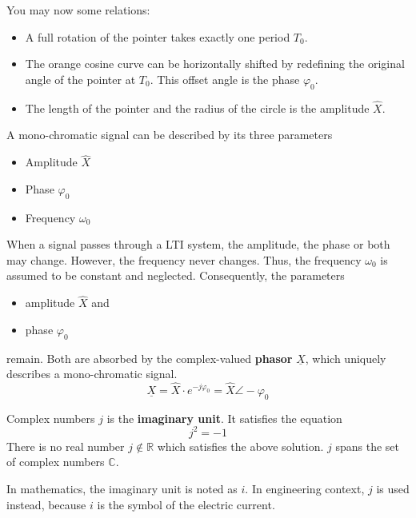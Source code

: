 \begin{refsection}
You may now some relations:
\begin{itemize}
	\item A full rotation of the pointer takes exactly one period $T_0$.
	\item The orange cosine curve can be horizontally shifted by redefining the original angle of the pointer at $T_0$. This offset angle is the phase $\varphi_0$.
	\item The length of the pointer and the radius of the circle is the amplitude $\hat{X}$.
\end{itemize}

A mono-chromatic signal can be described by its three parameters
\begin{itemize}
	\item Amplitude $\hat{X}$
	\item Phase $\varphi_0$
	\item Frequency $\omega_0$
\end{itemize}

When a signal passes through a \ac{LTI} system, the amplitude, the phase or both may change. However, the frequency never changes. Thus, the frequency $\omega_0$ is assumed to be constant and neglected. Consequently, the parameters
\begin{itemize}
	\item amplitude $\hat{X}$ and
	\item phase $\varphi_0$
\end{itemize}
remain. Both are absorbed by the complex-valued  \textbf{phasor} $\underline{X}$, which uniquely describes a mono-chromatic signal.
\begin{equation}
	\underline{X} = \hat{X} \cdot e^{-j \varphi_0} = \hat{X} \angle -\varphi_0
\end{equation}%

\begin{excursus}{Complex numbers}
	$j$ is the  \textbf{imaginary unit}. It satisfies the equation
	\begin{equation}
		j^2 = -1
	\end{equation}%
	There is no real number $j \notin \mathbb{R}$ which satisfies the above solution. $j$ spans the set of complex numbers $\mathbb{C}$.
	
	In mathematics, the imaginary unit is noted as $i$. In engineering context, $j$ is used instead, because $i$ is the symbol of the electric current.
	

\end{excursus}
\end{refsection}
